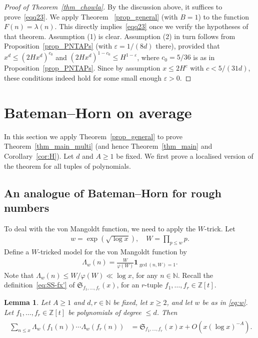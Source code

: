 \documentclass[11pt,letterpaper]{amsart}
\renewcommand{\leq}{\leqslant}
\renewcommand{\geq}{\geqslant}
\newtheorem{lemma}[theorem]{Lemma}
\theoremstyle{definition}
\numberwithin{equation}{section}
\newcommand\ZZ{\mathbb{Z}}
\newcommand\NN{\mathbb{N}}
\newcommand{\0}{\mathbf{0}}
\begin{document}
\begin{proof}[Proof of Theorem~\ref{thm_chowla}] By the discussion above, it suffices to prove~\eqref{eqq23}. We apply Theorem 
~\ref{prop_general} (with $B=1$) to the function $F(n)=\lambda(n)$. This directly implies~\eqref{eqq23}  once we verify the hypotheses of that theorem. Assumption (1) is clear. Assumption (2) in turn follows from Proposition~\ref{prop_PNTAPs} (with $\varepsilon=1/(8d)$ there), provided that $x^d\leq (2Hx^d)^{c_0}$ and $(2Hx^d)^{1-c_0}\leq H^{1-\varepsilon}$, where $c_0=5/36$ is as in Proposition~\ref{prop_PNTAPs}. Since by assumption $x\leq 2H^{c}$ with $c<5/(31d)$, these conditions indeed hold for some small enough $\varepsilon>0$.
\end{proof}


\section{Bateman--Horn on average}\label{sec:bateman-horn}

In this section we apply Theorem~\ref{prop_general} to prove Theorem~\ref{thm_main_multi} (and hence Theorem~\ref{thm_main} and Corollary~\ref{cor:H}).
Let $d$ and $A\geq 1$ be fixed. We first prove a localised version of the theorem for all tuples of polynomials.
  

\subsection{An analogue of Bateman--Horn for rough numbers}

To deal with the von Mangoldt function, we need to apply the $W$-trick. Let
\begin{align}\label{eq:w}
  w=\exp(\sqrt{\log x}),\quad W=\prod_{p\leq w}p.   
\end{align}
Define a $W$-tricked model for the von Mangoldt function by
\begin{align*}
\Lambda_{w}(n)=\frac{W}{\varphi(W)}\mathbf 1_{\gcd(n,W)=1}.    
\end{align*}
Note that $\Lambda_w(n)\leq W/\varphi(W)\ll \log x$, for any $n\in \NN$. 
Recall the definition~\eqref{eq:SS-fx'} of $\mathfrak{S}_{f_1,\dots,f_r}(x)$, for an  $r$-tuple 
$f_1,\dots,f_r\in \ZZ[t]$.

\begin{lemma}\label{le:lambdaw}
Let $A\geq 1$ and $d,r\in \mathbb{N}$ be fixed, let $x\geq 2$, and let $w$ be as in \eqref{eq:w}. Let $f_1,\ldots, f_r\in \mathbb{Z}[t]$ be polynomials of degree $\leq d$. Then \begin{align}\label{eq:wtrickbound}\begin{split}
\sum_{n\leq x}\Lambda_w(f_1(n))\cdots \Lambda_w(f_r(n))&= \mathfrak{S}_{f_1,\ldots, f_r}(x) x+O( x  (\log x)^{-A}).
\end{split}
\end{align}
\end{lemma}
\end{document}
